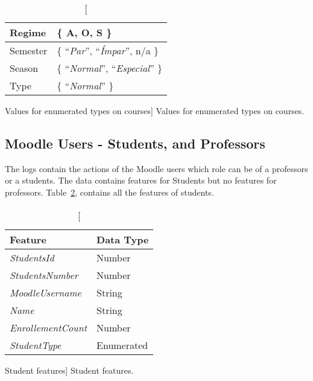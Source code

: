 \begin{table}[h!]
    \centering

    \begin{tabular}{| l | l |}
        \hline
        Regime   & \{ A, O, S \}                                    \\ \hline
        Semester & \{ ``\textit{Par}'', ``\textit{Ímpar}'', n/a \}  \\ \hline
        Season   & \{ ``\textit{Normal}'', ``\textit{Especial}'' \} \\ \hline
        Type     & \{ ``\textit{Normal}'' \}                        \\ \hline
    \end{tabular}

    \caption
        [Values for enumerated types on courses]
        {Values for enumerated types on courses.}

    \label{tab:courses_enum}
\end{table}

\subsection{Moodle Users - Students, and Professors}

The logs contain the actions of the Moodle users which role can be of a
professors or a students. The data contains features for Students but no
features for professors. Table~\ref{tab:students_features}, contains all the
features of students.

\begin{table}[h!]
    \centering

    \begin{tabular}{l l}
        Feature                   & Data Type  \\ \hline
        \textit{StudentsId}       & Number     \\
        \textit{StudentsNumber}   & Number     \\
        \textit{MoodleUsername}   & String     \\
        \textit{Name}             & String     \\
        \textit{EnrollementCount} & Number     \\
        \textit{StudentType}      & Enumerated \\
    \end{tabular}

    \caption
        [Student features]
        {Student features.}

    \label{tab:students_features}
\end{table}

